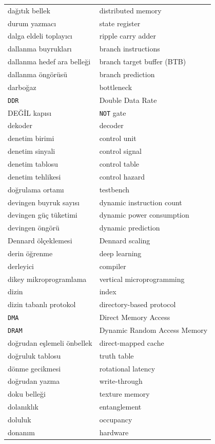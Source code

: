 {\begin{longtable}{@{}p{7.6cm}p{7.6cm}@{}}
dağıtık bellek & distributed memory \\
durum yazmacı & state register \\
dalga eldeli toplayıcı & ripple carry adder \\
dallanma buyrukları & branch instructions \\
dallanma hedef ara belleği & branch target buffer (BTB) \\
dallanma öngörüsü & branch prediction \\
darboğaz & bottleneck \\
\texttt{DDR} & Double Data Rate \\
DEĞİL kapısı & \texttt{NOT} gate \\
dekoder & decoder \\
denetim birimi & control unit \\
denetim sinyali & control signal \\
denetim tablosu & control table \\
denetim tehlikesi & control hazard \\
doğrulama ortamı & testbench \\
devingen buyruk sayısı & dynamic instruction count \\
devingen güç tüketimi & dynamic power consumption \\
devingen öngörü & dynamic prediction \\
Dennard ölçeklemesi & Dennard scaling \\
derin öğrenme & deep learning \\
derleyici & compiler \\
dikey mikroprogramlama & vertical microprogramming \\
dizin & index \\
dizin tabanlı protokol & directory-based protocol \\
\texttt{DMA} & Direct Memory Access \\
\texttt{DRAM} & Dynamic Random Access Memory \\
doğrudan eşlemeli önbellek & direct-mapped cache \\
doğruluk tablosu & truth table \\
dönme gecikmesi & rotational latency \\
doğrudan yazma & write-through \\
doku belleği & texture memory \\
dolanıklık & entanglement \\
doluluk & occupancy \\
donanım & hardware \\

\end{longtable}}
